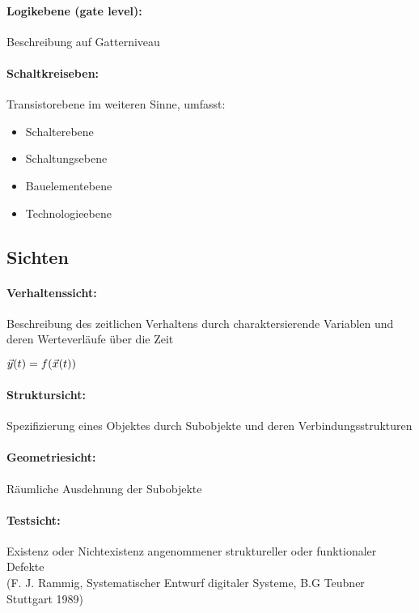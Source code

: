 	\paragraph{Logikebene (gate level):} Beschreibung auf Gatterniveau
	\paragraph{Schaltkreiseben:} Transistorebene im weiteren Sinne, umfasst:
		\begin{itemize}
			\item Schalterebene
			\item Schaltungsebene
			\item Bauelementebene
			\item Technologieebene
		\end{itemize}

\subsection{Sichten}
	\paragraph{Verhaltenssicht:} Beschreibung des zeitlichen Verhaltens durch charaktersierende Variablen und deren Werteverläufe über die Zeit
		
		\begin{center}
			\boldmath\( \mathlarger{\vec{y}(t) = f(\vec{x}(t))} \)
		\end{center}
	\paragraph{Struktursicht:} Spezifizierung eines Objektes durch Subobjekte und deren Verbindungsstrukturen
	
	\paragraph{Geometriesicht:} Räumliche Ausdehnung der Subobjekte
	
	\paragraph{Testsicht:} Existenz oder Nichtexistenz angenommener struktureller oder funktionaler Defekte \\(F. J. Rammig, Systematischer Entwurf digitaler Systeme, B.G Teubner Stuttgart 1989)
	
